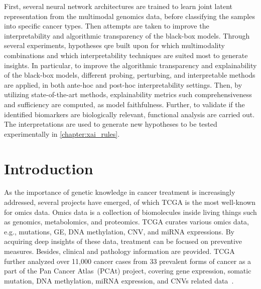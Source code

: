 \hspace*{3.5mm} First, several neural network architectures are trained to learn joint latent representation from the multimodal genomics data, before classifying the samples into specific cancer types. Then attempts are taken to improve the interpretability and algorithmic transparency of the black-box models. Through several experiments, hypotheses qre built upon for which multimodality combinations and which interpretability techniques are suited most to generate insights. In particular, to improve the algorithmic transparency and explainability of the black-box models, different probing, perturbing, and interpretable methods are applied, in both ante-hoc and post-hoc interpretability settings. Then, by utilizing state-of-the-art methods, explainability metrics such comprehensiveness and sufficiency are computed, as model faithfulness. Further, to validate if the identified biomarkers are biologically relevant, functional analysis are carried out. The interpretations are used to generate new hypotheses to be tested experimentally in \cref{chapter:xai_rules}. %

\section{Introduction}\label{chapter_5:intro}
As the importance of genetic knowledge in cancer treatment is increasingly addressed, several projects have emerged, of which TCGA is the most well-known for omics data. Omics data is a collection of biomolecules inside living things such as genomics, metabolomics, and proteomics. TCGA curates various omics data, e.g., mutations, GE, DNA methylation, CNV, and miRNA expressions. By acquiring deep insights of these data, treatment can be focused on preventive measures. Besides, clinical and pathology information are provided. TCGA further analyzed over 11,000 cancer cases from 33 prevalent forms of cancer as a part of the Pan Cancer Atlas~(PCAt) project, covering gene expression, somatic mutation, DNA methylation, miRNA expression, and CNVs related data~\cite{lyu2018deep}. 

